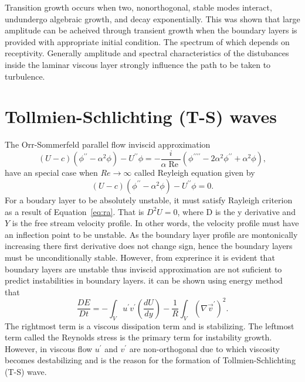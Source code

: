 \documentclass[twoside]{iitbreport}
\newcommand{\Eqref}[1]{Equation~\eqref{eq:#1}}
\begin{document}
Transition growth occurs when two, nonorthogonal, stable modes interact,
undundergo algebraic growth, and decay exponentially. This was shown that
large amplitude can be acheived through transient growth when the boundary
layers is provided with appropriate initial condition. The spectrum of
which depends on receptivity. Generally amplitude and spectral
characteristics of the distubances inside the laminar viscous layer
strongly influence the path to be taken to turbulence.

\section{Tollmien-Schlichting (T-S) waves}

The Orr-Sommerfeld parallel flow inviscid approximation
\begin{equation}
  (U-c)\left(\phi^{\prime \prime}-\alpha^{2} \phi\right)-U^{\prime \prime}
  \phi=-\frac{i}{\alpha \operatorname{Re}}\left(\phi^{\prime \prime \prime
  \prime}-2 \alpha^{2} \phi^{\prime \prime}+\alpha^{2} \phi\right),
  \label{eq:os}
\end{equation}
have an special case when $Re \to \infty$ called Reyleigh equation given by
\begin{equation}
 (U-c)\left(\phi^{\prime \prime}-\alpha^{2} \phi\right)-U^{\prime \prime}
 \phi=0. 
  \label{eq:ra}
\end{equation}
For a boudary layer to be absolutely unstable, it must satisfy Rayleigh
criterion as a result of \Eqref{ra}. That is $D^2U = 0$, where D is the y
derivative and $Y$ is the free stream velocity profile. In other words, the
velocity profile must have an inflection point to be unstable. As the
boundary  layer profile are montonically increasing there first derivative
does not change sign, hence the boundary layers must be unconditionally
stable. However, from exprerince it is evident that boundary layers are
unstable thus inviscid approximation are not suficient to predict
instabilities in boundary layers. it can be shown using energy method that
\begin{equation}
 \frac{D E}{D t}=-\int_{V} u^{\prime} v^{\prime}\left(\frac{d U}{d
 y}\right)-\frac{1}{R} \int_{V}\left(\nabla \vec{v}^{\prime}\right)^{2}. 
  \label{eq:energy}
\end{equation}
The rightmost term is a viscous dissipation term and is stabilizing. The
leftmost term called the Reynolds stress is the primary term for instability
growth. However, in viscous flow $u^{'}$ and $v^{'}$ are non-orthogonal
due to which viscosity becomes destabilizing and is the reason for the
formation of Tollmien-Schlichting (T-S) wave.
\end{document}
